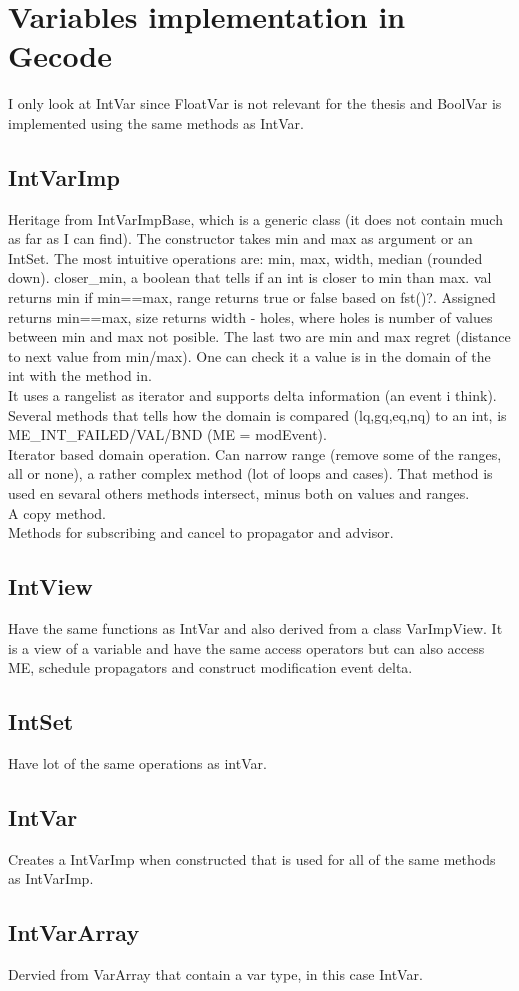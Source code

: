 \documentclass[a4paper,10pt]{article}
\begin{document}
\section{Variables implementation in Gecode}
I only look at IntVar since FloatVar is not relevant for the thesis and BoolVar is implemented using the same methods 
as IntVar. 

\subsection{IntVarImp}
Heritage from IntVarImpBase, which is a generic class (it does not contain much as far as I can find). The constructor 
takes min and max as argument or an IntSet. The most intuitive operations are: min, max, width, median (rounded down). 
closer\_min, a boolean that tells if an int is closer to min than max. val returns min if min==max, range returns true 
or false based on fst()?. Assigned returns min==max, size returns width - holes, where holes is number of values 
between min and max not posible. The last two are min and max regret (distance to next value from min/max). One can 
check it a value is in the domain of the int with the method in. \\ 
It uses a rangelist as iterator and supports delta information (an event i think). \\ 
Several methods that tells how the domain is compared (lq,gq,eq,nq) to an int, is ME\_INT\_FAILED/VAL/BND (ME = 
modEvent). \\ 
Iterator based domain operation. Can narrow range (remove some of the ranges, all or none), a rather complex method 
(lot of loops and cases). That method is used en sevaral others methods intersect, minus both on values and ranges. 
\\ 
A copy method. \\
Methods for subscribing and cancel to propagator and advisor.

\subsection{IntView}
Have the same functions as IntVar and also derived from a class VarImpView. It is a view of a variable and have the 
same access operators but can also access ME, schedule propagators and construct modification event delta. 	
\subsection{IntSet}
Have lot of the same operations as intVar. 
\subsection{IntVar}
Creates a IntVarImp when constructed that is used for all of the same methods as IntVarImp.
\subsection{IntVarArray}
Dervied from VarArray that contain a var type, in this case IntVar. 
\end{document}
